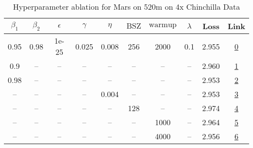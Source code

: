 \begin{table}[H]
\centering
\caption{Hyperparameter ablation for Mars on 520m on 4x Chinchilla Data}
\label{tab:ablation_mars_520m_4}
\begin{tabular}{cccccccccc}
\toprule
$\beta_1$ & $\beta_2$ & $\epsilon$ & $\gamma$ & $\eta$ & $\mathrm{BSZ}$ & $\mathrm{warmup}$ & $\lambda$ & Loss & Link \\
\midrule
0.95 & 0.98 & 1e-25 & 0.025 & 0.008 & 256 & 2000 & 0.1 & 2.955 & \href{https://wandb.ai/stanford-mercury/optimizer-scaling/runs/sweep-520m-42B-mars50507flr0.008-wd0.1-minlr0-warmup2000-b10.95--b5cf73}{0} \\
\midrule
0.9 & -- & -- & -- & -- & -- & -- & -- & 2.960 & \href{https://wandb.ai/stanford-mercury/optimizer-scaling/runs/sweep-520m-42B-marsffc1cflr0.008-wd0.1-minlr0-warmup2000-b10.9-b-c89306}{1} \\
0.98 & -- & -- & -- & -- & -- & -- & -- & 2.953 & \href{https://wandb.ai/stanford-mercury/optimizer-scaling/runs/sweep-520m-42B-mars10209dlr0.008-wd0.1-minlr0-warmup2000-b10.98--1ae65b}{2} \\
-- & -- & -- & -- & 0.004 & -- & -- & -- & 2.953 & \href{https://wandb.ai/stanford-mercury/optimizer-scaling/runs/sweep-520m-42B-marsf1861clr0.004-wd0.1-minlr0-warmup2000-b10.95--ff7186}{3} \\
-- & -- & -- & -- & -- & 128 & -- & -- & 2.974 & \href{https://wandb.ai/stanford-mercury/optimizer-scaling/runs/sweep-520m-42B-marsf698a0lr0.008-wd0.1-minlr0-warmup2000-b10.95--039978}{4} \\
-- & -- & -- & -- & -- & -- & 1000 & -- & 2.964 & \href{https://wandb.ai/stanford-mercury/optimizer-scaling/runs/sweep-520m-42B-mars396887lr0.008-wd0.1-minlr0-warmup1000-b10.95--61c217}{5} \\
-- & -- & -- & -- & -- & -- & 4000 & -- & 2.956 & \href{https://wandb.ai/stanford-mercury/optimizer-scaling/runs/sweep-520m-42B-mars5f83cclr0.008-wd0.1-minlr0-warmup4000-b10.95--d5771f}{6} \\
\bottomrule
\end{tabular}
\end{table}

